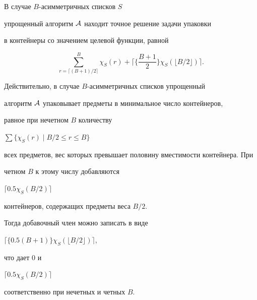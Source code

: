 \begin{lem}


\label {lm2p}


В случае $B$-асимметричных списков $S$


упрощенный алгоритм ${\cal A}$ находит точное решение задачи упаковки


в контейнеры со значением целевой функции, равной


$$


\sum_{r= \lceil (B+1)/2 \rceil }^{B} \chi_S(r)+


\biggl\lceil \biggl\{ \frac {B+1}{2} \biggr\}


\chi_S(\lfloor B/2 \rfloor ) \biggr \rceil .


$$


\end {lem}





\begin{pf}


Действительно, в случае $B$-асимметричных списков упрощенный


алгоритм ${\cal A}$ упаковывает предметы в минимальное число контейнеров,


равное при нечетном $B$ количеству


$\sum \{ \chi_S(r)\mid B/2 \le r \le B\}$


всех предметов, вес которых превышает половину вместимости контейнера. При


четном $B$ к этому числу добавляются


$\lceil 0.5\chi_S(B/2)\rceil$


контейнеров, содержащих предметы веса $B/2$.


Тогда добавочный член можно записать в виде


$\lceil\{0.5(B+1)\}


\chi_S(\lfloor B/2 \rfloor )\rceil$,


что дает $0$ и


$\lceil 0.5\chi_S(B/2)\rceil$


соответственно при нечетных и четных $B$.


\end{pf}





\section{ \ }





